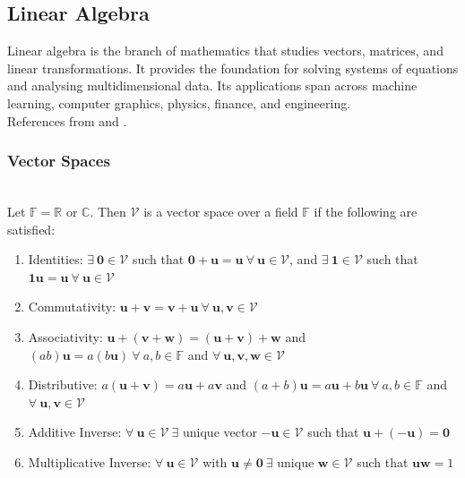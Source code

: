 \subsection{Linear Algebra}

Linear algebra is the branch of mathematics that studies vectors, matrices, and linear transformations. It provides the foundation for solving systems of equations and analysing multidimensional data. Its applications span across machine learning, computer graphics, physics, finance, and engineering.\\
References from \cite{garcia2017second} and \cite{axler2024linear}.

\subsubsection{Vector Spaces}

\begin{definition} \\
Let $\mathbb{F} = \mathbb{R}$ or $\mathbb{C}$. Then $\mathcal{V}$ is a vector space over a field $\mathbb{F}$ if the following are satisfied:
\begin{enumerate}[label=\roman*.]
\setlength{\itemsep}{0pt}
\item Identities: $\exists \ \mathbf{0} \in \mathcal{V}$ such that $\mathbf{0} + \mathbf{u} = \mathbf{u} \ \forall \ \mathbf{u} \in \mathcal{V}$, and $\exists \ \mathbf{1} \in \mathcal{V}$ such that $\mathbf{1} \mathbf{u} = \mathbf{u} \ \forall \ \mathbf{u} \in \mathcal{V}$
\item Commutativity: $\mathbf{u} + \mathbf{v} = \mathbf{v} + \mathbf{u} \ \forall \ \mathbf{u}, \mathbf{v} \in \mathcal{V}$
\item Associativity: $\mathbf{u} + (\mathbf{v} + \mathbf{w}) = (\mathbf{u} + \mathbf{v}) + \mathbf{w}$ and $(ab) \mathbf{u} = a(b \mathbf{u}) \ \forall \ a, b \in \mathbb{F}$ and $\forall \ \mathbf{u}, \mathbf{v}, \mathbf{w} \in \mathcal{V}$
\item Distributive: $a(\mathbf{u} + \mathbf{v}) = a \mathbf{u} + a \mathbf{v}$ and $(a + b)\mathbf{u} = a \mathbf{u} + b \mathbf{u} \ \forall \ a, b \in \mathbb{F}$ and $\forall \ \mathbf{u}, \mathbf{v} \in \mathcal{V}$
\item Additive Inverse: $\forall \ \mathbf{u} \in \mathcal{V} \ \exists$ unique vector $-\mathbf{u} \in \mathcal{V}$ such that $\mathbf{u} + (- \mathbf{u}) = \mathbf{0}$
\item Multiplicative Inverse: $\forall \ \mathbf{u} \in \mathcal{V}$ with $\mathbf{u} \neq \mathbf{0} \ \exists$ unique $\mathbf{w} \in \mathcal{V}$ such that $\mathbf{u} \mathbf{w} = 1$
\end{enumerate}
\end{definition}

